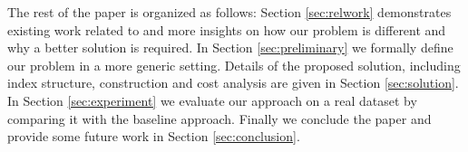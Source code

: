 The rest of the paper is organized as follows: Section \ref{sec:relwork} demonstrates existing work related to {\rrp} and more insights on how our problem is different and why a better solution is required. In Section \ref{sec:preliminary} we formally define our problem in a more generic setting. Details of the proposed solution, including index structure, construction and cost analysis are given in Section \ref{sec:solution}. In Section \ref{sec:experiment} we evaluate our approach on a real dataset by comparing it with the baseline approach. Finally we conclude the paper and provide some future work in Section \ref{sec:conclusion}.

